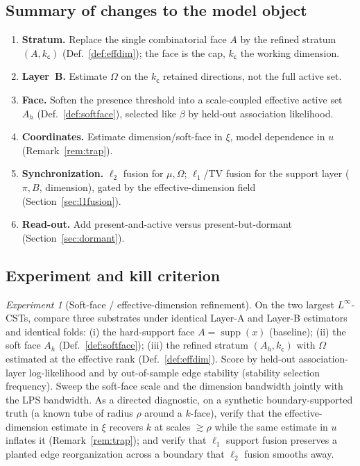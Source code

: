 \documentclass[11pt]{article}
\theoremstyle{definition}
\theoremstyle{plain}
\theoremstyle{remark}
\newtheorem{experiment}{Experiment}
\newcommand{\Linf}{L^{\infty}}
\newcommand{\supp}{\operatorname{supp}}
\newcommand{\1}{\mathbf{1}}
\newcommand{\Prec}{\Omega}
\newcommand{\Pres}{\pi}
\newcommand{\Edge}{B}
\newcommand{\cc}{\mathsf{c}}              %
\begin{document}
\subsection{Summary of changes to the model object}
\label{sec:addsummary}

\begin{enumerate}[leftmargin=1.5em]
\item \textbf{Stratum.} Replace the single combinatorial face $A$ by the refined
  stratum $(A,k_\cc)$ (Def.~\ref{def:effdim}); the face is the cap, $k_\cc$ the
  working dimension.
\item \textbf{Layer~B.} Estimate $\Prec$ on the $k_\cc$ retained directions, not
  the full active set.
\item \textbf{Face.} Soften the presence threshold into a scale-coupled effective
  active set $A_h$ (Def.~\ref{def:softface}), selected like $\beta$ by held-out
  association likelihood.
\item \textbf{Coordinates.} Estimate dimension/soft-face in $\xi$, model
  dependence in $u$ (Remark~\ref{rem:trap}).
\item \textbf{Synchronization.} $\ell_2$ fusion for $\mu,\Prec$; $\ell_1$/TV
  fusion for the support layer ($\Pres,\Edge$, dimension), gated by the
  effective-dimension field (Section~\ref{sec:l1fusion}).
\item \textbf{Read-out.} Add present-and-active versus present-but-dormant
  (Section~\ref{sec:dormant}).
\end{enumerate}

\subsection{Experiment and kill criterion}
\label{sec:addexp}

\begin{experiment}[Soft-face / effective-dimension refinement]\label{exp:softface}
On the two largest $\Linf$-CSTs, compare three substrates under identical Layer-A
and Layer-B estimators and identical folds: (i) the hard-support face $A=\supp(x)$
(baseline); (ii) the soft face $A_h$ (Def.~\ref{def:softface}); (iii) the refined
stratum $(A_h,k_\cc)$ with $\Prec$ estimated at the effective rank
(Def.~\ref{def:effdim}). Score by held-out association-layer log-likelihood and by
out-of-sample edge stability (stability selection frequency). Sweep the soft-face
scale and the dimension bandwidth jointly with the LPS bandwidth. As a directed
diagnostic, on a synthetic boundary-supported truth (a known tube of radius $\rho$
around a $k$-face), verify that the effective-dimension estimate in $\xi$ recovers
$k$ at scales $\gtrsim\rho$ while the same estimate in $u$ inflates it
(Remark~\ref{rem:trap}); and verify that $\ell_1$ support fusion preserves a
planted edge reorganization across a boundary that $\ell_2$ fusion smooths away.
\end{experiment}
\end{document}
